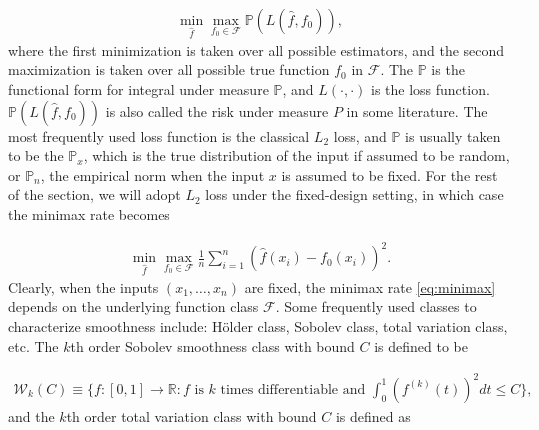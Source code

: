 \documentclass[a4paper]{article}
\newcommand{\RR}{\mathbb{R}}
\renewcommand{\cal}{\mathcal}
\begin{document}
\begin{align*}
\min_{\hat{f}}\max_{f_0\in\cal{F}} \mathbb{P}(L(\hat{f}, f_0)),
\end{align*}
where the first minimization is taken over all possible estimators, and the second maximization is taken over all possible true function $f_0$ in $\cal{F}$. The $\mathbb{P}$ is the functional form for integral under measure $\mathbb{P}$, and $L(\cdot, \cdot)$ is the loss function. $\mathbb{P}(L(\hat{f}, f_0))$ is also called the risk under measure $P$ in some literature. The most frequently used loss function is the classical $L_2$ loss, and $\mathbb{P}$ is usually taken to be the $\mathbb{P}_x$, which is the true distribution of the input if assumed to be random, or $\mathbb{P}_n$, the empirical norm when the input $x$ is assumed to be fixed. For the rest of the section, we will adopt $L_2$ loss under the fixed-design setting, in which case the minimax rate becomes

\begin{align}
\min_{\hat{f}}\max_{f_0\in\cal{F}}\frac{1}{n}\sum_{i=1}^n(\hat{f}(x_i)-f_0(x_i))^2.
\label{eq:minimax}
\end{align}
Clearly, when the inputs $(x_1,\ldots, x_n)$ are fixed, the minimax rate \eqref{eq:minimax} depends on the underlying function class $\cal{F}$. Some frequently used classes to characterize smoothness include: H\"older class, Sobolev class, total variation class, etc. The $k$th order Sobolev smoothness class with bound $C$ is defined to be 

\begin{align*}
\cal{W}_k(C) \equiv \{f:[0, 1]\rightarrow \RR: f \text{ is $k$ times differentiable and } \int_0^1(f^{(k)}(t))^2dt\leq C\},
\end{align*}
and the $k$th order total variation class with bound $C$ is defined as
\end{document}
